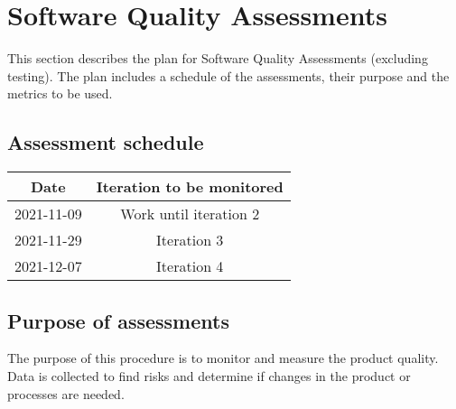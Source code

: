 \section{Software Quality Assessments}
\label{sec:sqa}
This section describes the plan for Software Quality Assessments (excluding testing). The plan includes a schedule of the assessments, their purpose and the metrics to be used.



\subsection{Assessment schedule}
\label{subsec:assessment-schedule}
\begin{table}[H]
\centering
\begin{tabular}{||c c||} 
\hline
Date & Iteration to be monitored \\ [0.5ex] 
\hline\hline
2021-11-09 & Work until iteration 2 \\
\hline
2021-11-29 & Iteration 3 \\
\hline
2021-12-07 & Iteration 4 \\
\hline
\end{tabular}
\end{table}

\subsection{Purpose of assessments}
The purpose of this procedure is to monitor and measure the product quality. Data is collected to find risks and determine if changes in the product or processes are needed.

